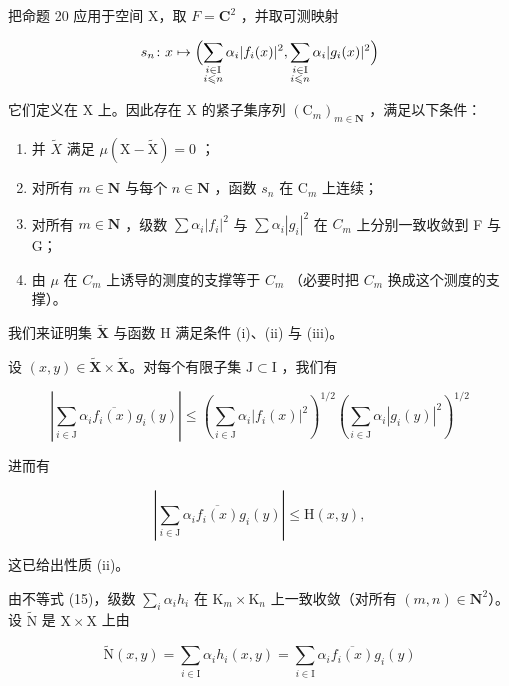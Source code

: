 把命题 20 应用于空间 X，取 \(F = \mathbf{C}^{2}\) ，并取可测映射

\[
s_{n}\colon x\mapsto \Bigl (\sum_{\substack{i\in \mathrm{I}\\ i\leqslant n}}\alpha_{i}|f_{i}(x)|^{2},\sum_{\substack{i\in \mathrm{I}\\ i\leqslant n}}\alpha_{i}|g_{i}(x)|^{2}\Bigr)
\]

它们定义在 X 上。因此存在 X 的紧子集序列 \((\mathrm{C}_{m})_{m\in\mathbf{N}}\) ，满足以下条件：

\begin{enumerate}
\def\labelenumi{(\arabic{enumi})}
\item
  并 \(\widetilde{X}\) 满足 \(\mu(\mathrm{X}-\widetilde{\mathrm{X}})=0\) ；
\item
  对所有 \(m \in \mathbf{N}\) 与每个 \(n \in \mathbf{N}\) ，函数 \(s_n\) 在 \(\mathrm{C}_m\) 上连续；
\item
  对所有 \(m \in \mathbf{N}\) ，级数 \(\sum \alpha_{i}|f_{i}|^{2}\) 与 \(\sum \alpha_{i}|g_{i}|^{2}\) 在 \(C_{m}\) 上分别一致收敛到 F 与 G；
\item
  由 \(\mu\) 在 \(C_{m}\) 上诱导的测度的支撑等于 \(C_{m}\) （必要时把 \(C_{m}\) 换成这个测度的支撑）。
\end{enumerate}

我们来证明集 \(\widetilde{\mathbf{X}}\) 与函数 H 满足条件 (i)、(ii) 与 (iii)。

设 \((x,y)\in \widetilde{\mathbf{X}}\times \widetilde{\mathbf{X}}\)。对每个有限子集 \(\mathrm{J}\subset \mathrm{I}\) ，我们有

\[
\left| \sum_ {i \in \mathrm{J}} \alpha_ {i} \overline {{f _ {i} (x)}} g _ {i} (y) \right| \leqslant \left(\sum_ {i \in \mathrm{J}} \alpha_ {i} | f _ {i} (x) | ^ {2}\right) ^ {1 / 2} \left(\sum_ {i \in \mathrm{J}} \alpha_ {i} | g _ {i} (y) | ^ {2}\right) ^ {1 / 2}\tag{15}
\]

进而有

\[
\left| \sum_ {i \in \mathrm{J}} \alpha_ {i} \overline {{f _ {i} (x)}} g _ {i} (y) \right| \leqslant \mathrm{H} (x, y),\tag{16}
\]

这已给出性质 (ii)。

由不等式 (15)，级数 \(\sum_{i} \alpha_{i} h_{i}\) 在 \(\mathrm{K}_{m} \times \mathrm{K}_{n}\) 上一致收敛（对所有 \((m, n) \in \mathbf{N}^{2}\)）。设 \(\widetilde{\mathrm{N}}\) 是 \(\mathrm{X} \times \mathrm{X}\) 上由

\[
\widetilde {\mathrm{N}} (x, y) = \sum_ {i \in \mathrm{I}} \alpha_ {i} h _ {i} (x, y) = \sum_ {i \in \mathrm{I}} \alpha_ {i} \overline {{f _ {i} (x)}} g _ {i} (y)
\]

